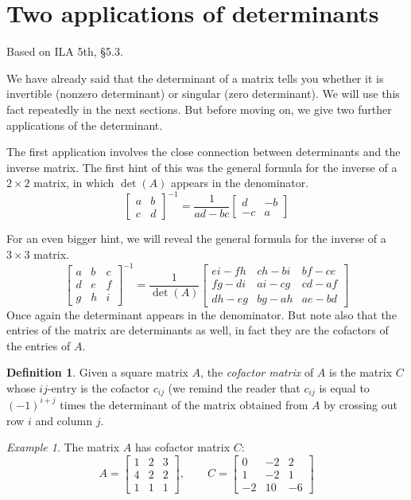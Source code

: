 \documentclass[11pt,oneside]{amsbook}
\theoremstyle{definition}
\theoremstyle{plain}
\theoremstyle{definition}
\newtheorem{definition}[theorem]{Definition}
\theoremstyle{remark}
\newtheorem{example}[theorem]{Example}
\numberwithin{equation}{section}
\numberwithin{figure}{section}
\begin{document}
\newpage
\section{Two applications of determinants}

Based on ILA 5th, \S 5.3.

We have already said that the determinant of a matrix tells you whether it is invertible (nonzero determinant) or singular (zero determinant). We will use this fact repeatedly in the next sections. But before moving on, we give two further applications of the determinant.

The first application involves the close connection between determinants and the inverse matrix. The first hint of this was the general formula for the inverse of a $2\times 2$ matrix, in which $\det(A)$ appears in the denominator.
\[\begin{bmatrix}a&b\\c&d\end{bmatrix}^{-1}
  =\frac{1}{ad-bc}\begin{bmatrix}d&-b\\-c&a\end{bmatrix}
\]

For an even bigger hint, we will reveal the general formula for the inverse of a $3\times 3$ matrix.
\[\begin{bmatrix}a&b&c\\d&e&f\\g&h&i\end{bmatrix}^{-1}
  =\frac{1}{\det(A)}\begin{bmatrix}ei-fh&ch-bi&bf-ce\\fg-di&ai-cg&cd-af\\
  dh-eg&bg-ah&ae-bd\end{bmatrix}
\]
Once again the determinant appears in the denominator. But note also that the entries of the matrix are determinants as well, in fact they are the cofactors of the entries of $A$.

\begin{definition}
  Given a square matrix $A$, the \emph{cofactor matrix} of $A$ is the matrix $C$ whose $ij$-entry is the cofactor $c_{ij}$ (we remind the reader that $c_{ij}$ is equal to $(-1)^{i+j}$ times the determinant of the matrix obtained from $A$ by crossing out row $i$ and column $j$.
\end{definition}

\begin{example}
  The matrix $A$ has cofactor matrix $C$:
  \[A=\begin{bmatrix}1&2&3\\4&2&2\\1&1&1\end{bmatrix},\qquad
    C=\begin{bmatrix}0&-2&2\\1&-2&1\\-2&10&-6\end{bmatrix}
  \]
\end{example}  
\end{document}
